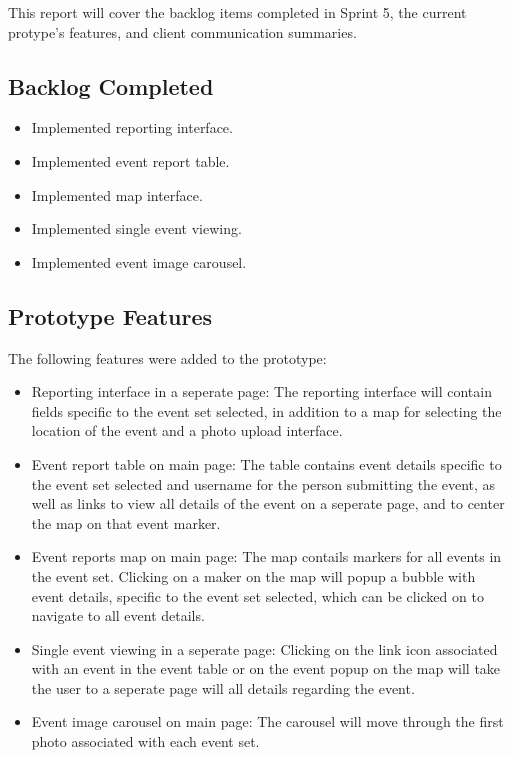 
This report will cover the backlog items completed in Sprint 5, the current protype's features, and client communication summaries. 

 \subsection{Backlog Completed}
\begin{itemize}
\item Implemented reporting interface. 
\item Implemented event report table. 
\item Implemented map interface.
\item Implemented single event viewing.  
\item Implemented event image carousel.
\end{itemize}
 
\subsection{Prototype Features}
The following features were added to the prototype:
\begin{itemize}
\item Reporting interface in a seperate page: The reporting interface will contain fields specific to the event set selected, in addition to a map for selecting the location of the event and a photo upload interface.
\item Event report table on main page: The table contains event details specific to the event set selected and username for the person submitting the event, as well as links to view all details of the event on a seperate page, and to center the map on that event marker. 
\item Event reports map on main page: The map contails markers for all events in the event set. Clicking on a maker on the map will popup a bubble with event details, specific to the event set selected, which can be clicked on to navigate to all event details.
\item Single event viewing in a seperate page: Clicking on the link icon associated with an event in the event table or on the event popup on the map will take the user to a seperate page will all details regarding the event.
\item Event image carousel on main page: The carousel will move through the first photo associated with each event set.
\end{itemize}

